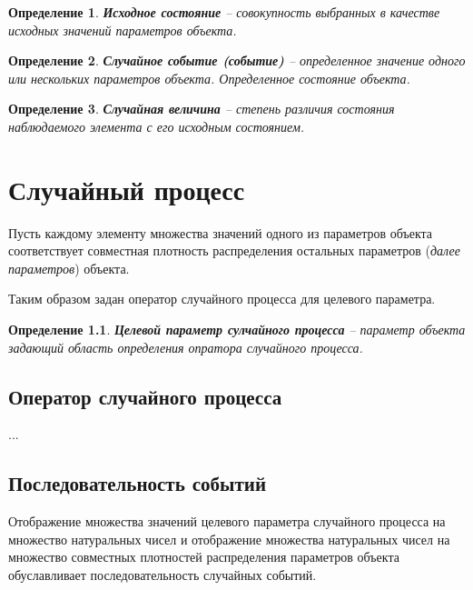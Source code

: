 \documentclass[a4paper,11pt]{report}
\newtheorem{definition}{Определение}
\begin{document}
      \begin{definition}
        \textbf{Исходное состояние} -- совокупность выбранных в качестве исходных значений параметров объекта.
      \end{definition}

      \begin{definition}
        \textbf{Случайное событие (событие)} -- определенное значение одного или нескольких параметров объекта. Определенное состояние объекта.
      \end{definition}
        
      \begin{definition}
        \textbf{Случайная величина} -- степень различия состояния наблюдаемого элемента с его исходным состоянием.
      \end{definition}

      

  \chapter{Случайный процесс}
  
    Пусть каждому элементу множества значений одного из параметров объекта соответствует совместная плотность распределения остальных параметров (\emph{далее параметров}) объекта. 
    
    Таким образом задан оператор случайного процесса для целевого параметра. 
    
    \begin{definition}
        \textbf{Целевой параметр сулчайного процесса} -- параметр объекта задающий область определения опратора случайного процесса.
      \end{definition}
     
    \section{Оператор случайного процесса}
    
    ...
    
  
    \section{Последовательность событий}
    
      Отображение множества значений целевого параметра случайного процесса на множество натуральных чисел и отображение множества натуральных чисел на множество совместных плотностей распределения параметров объекта обуславливает последовательность случайных событий.
      
\end{document}
